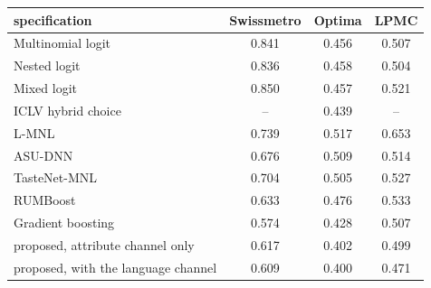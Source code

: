 \begin{tabular}{lccc}
\toprule
specification & Swissmetro & Optima & LPMC \\
\midrule
Multinomial logit & 0.841 & 0.456 & 0.507 \\
Nested logit & 0.836 & 0.458 & 0.504 \\
Mixed logit & 0.850 & 0.457 & 0.521 \\
ICLV hybrid choice & -- & 0.439 & -- \\
L-MNL \citep{sifringer2020enhancing} & 0.739 & 0.517 & 0.653 \\
ASU-DNN \citep{wang2020deep} & 0.676 & 0.509 & 0.514 \\
TasteNet-MNL \citep{han2022tastenet} & 0.704 & 0.505 & 0.527 \\
RUMBoost \citep{salvade2024rumboost} & 0.633 & 0.476 & 0.533 \\
Gradient boosting \citep{hillel2021systematic} & 0.574 & 0.428 & 0.507 \\
\midrule
proposed, attribute channel only & 0.617 & 0.402 & 0.499 \\
proposed, with the language channel & 0.609 & 0.400 & 0.471 \\
\bottomrule
\end{tabular}